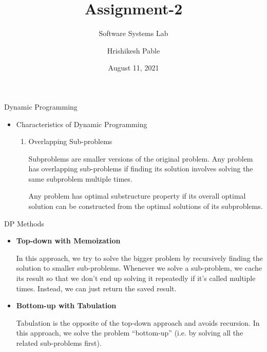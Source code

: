 \documentclass{beamer}[10pt]
\title{\textrm{Assignment-2}}
\subtitle{\textrm{Software Systems Lab}}
\author{\textrm{Hrishikesh Pable }}
\institute{IIT Dharwad \\
\href{https://www.iitdh.ac.in/}{\texttt{https://www.iitdh.ac.in/}}}
\date{August 11, 2021}
\begin{document}
\maketitle

    

\begin{frame}{Dynamic Programming}
\begin{itemize}
    \item Characteristics of Dynamic Programming
    \begin{enumerate}
        \item Overlapping Sub-problems
        \begin{block}{1}
            Subproblems are smaller versions of the original problem. Any problem has overlapping sub-problems if finding its solution involves solving the same subproblem multiple times.
        \end{block}
        \begin{block}{2}
            Any problem has optimal substructure property if its overall optimal solution can be constructed from the optimal solutions of its subproblems.
        \end{block}
    \end{enumerate}
\end{itemize}
    
\end{frame}

\begin{frame}{DP Methods}

\begin{itemize}
    \item \textbf{Top-down with Memoization}
    \begin{block}{1}
    In this approach, we try to solve the bigger problem by recursively finding the solution to smaller sub-problems. Whenever we solve a sub-problem, we cache its result so that we don’t end up solving it repeatedly if it’s called multiple times. Instead, we can just return the saved result.

    \end{block}
    
    \item <2-> \textbf{Bottom-up with Tabulation}
    \begin{alertblock}{2}
    Tabulation is the opposite of the top-down approach and avoids recursion. In this approach, we solve the problem “bottom-up” (i.e. by solving all the related sub-problems first).

    
    \end{alertblock}
\end{itemize}
    
\end{frame}
\end{document}
